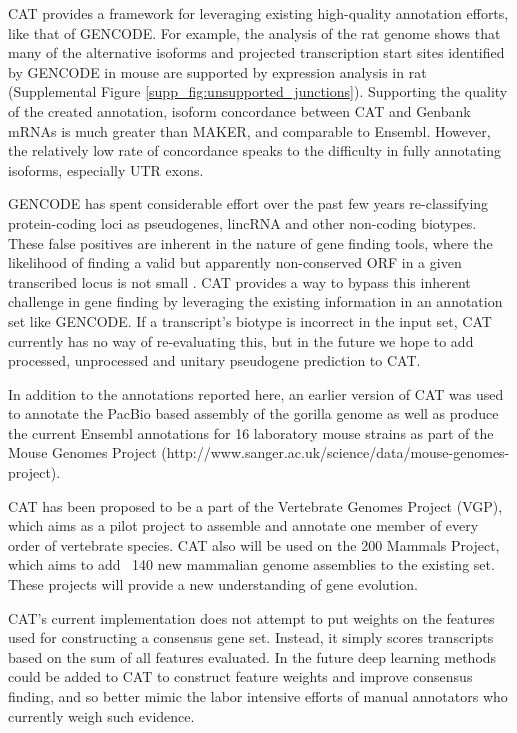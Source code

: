 \documentclass[fleqn,10pt]{wlscirep}
\begin{document}
CAT provides a framework for leveraging existing high-quality annotation efforts, like that of GENCODE. For example, the analysis of the rat genome shows that many of the alternative isoforms and projected transcription start sites identified by GENCODE in mouse are supported by expression analysis in rat (Supplemental Figure \ref{supp_fig:unsupported_junctions}). Supporting the quality of the created annotation, isoform concordance between CAT and Genbank mRNAs is much greater than MAKER, and comparable to Ensembl. However, the relatively low rate of concordance speaks to the difficulty in fully annotating isoforms, especially UTR exons. 

GENCODE has spent considerable effort over the past few years re-classifying protein-coding loci as pseudogenes, lincRNA and other non-coding biotypes. These false positives are inherent in the nature of gene finding tools, where the likelihood of finding a valid but apparently non-conserved ORF in a given transcribed locus is not small \cite{lin2011phylocsf}. CAT provides a way to bypass this inherent challenge in gene finding by leveraging the existing information in an annotation set like GENCODE. If a transcript’s biotype is incorrect in the input set, CAT currently has no way of re-evaluating this, but in the future we hope to add processed, unprocessed and unitary pseudogene prediction to CAT.

In addition to the annotations reported here, an earlier version of CAT was used to annotate the PacBio based assembly of the gorilla genome \cite{gordon2016long} as well as produce the current Ensembl annotations for 16 laboratory mouse strains as part of the Mouse Genomes Project (http://www.sanger.ac.uk/science/data/mouse-genomes-project).

CAT has been proposed to be a part of the Vertebrate Genomes Project (VGP), which aims as a pilot project to assemble and annotate one member of every order of vertebrate species. CAT also will be used on the 200 Mammals Project, which aims to add ~140 new mammalian genome assemblies to the existing set. These projects will provide a new understanding of gene evolution.

CAT’s current implementation does not attempt to put weights on the features used for constructing a consensus gene set. Instead, it simply scores transcripts based on the sum of all features evaluated. In the future deep learning methods could be added to CAT to construct feature weights and improve consensus finding, and so better mimic the labor intensive efforts of manual annotators who currently weigh such evidence.
\end{document}

